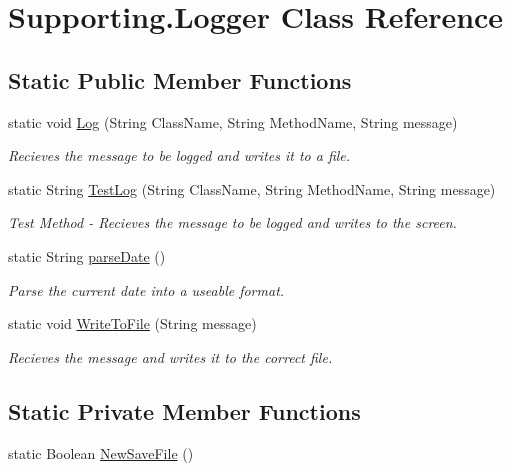 \hypertarget{class_supporting_1_1_logger}{}\section{Supporting.\+Logger Class Reference}
\label{class_supporting_1_1_logger}
\subsection*{Static Public Member Functions}
\begin{DoxyCompactItemize}
\item 
static void \hyperlink{class_supporting_1_1_logger_a97d68cf420558101dcfcff2fd28b63bb}{Log} (String Class\+Name, String Method\+Name, String message)
\begin{DoxyCompactList}\small\item\em Recieves the message to be logged and writes it to a file. \end{DoxyCompactList}\item 
static String \hyperlink{class_supporting_1_1_logger_ac2884dd455d6175b5f99af25a2ee802f}{Test\+Log} (String Class\+Name, String Method\+Name, String message)
\begin{DoxyCompactList}\small\item\em Test Method -\/ Recieves the message to be logged and writes to the screen. \end{DoxyCompactList}\item 
static String \hyperlink{class_supporting_1_1_logger_ae8e3a7713e163c2d18710067a2ae438f}{parse\+Date} ()
\begin{DoxyCompactList}\small\item\em Parse the current date into a useable format. \end{DoxyCompactList}\item 
static void \hyperlink{class_supporting_1_1_logger_acd4a2f51ea4e6b0518a99c5bfc056177}{Write\+To\+File} (String message)
\begin{DoxyCompactList}\small\item\em Recieves the message and writes it to the correct file. \end{DoxyCompactList}\end{DoxyCompactItemize}
\subsection*{Static Private Member Functions}
\begin{DoxyCompactItemize}
\item 
static Boolean \hyperlink{class_supporting_1_1_logger_aa22d1401d70452b142e7f90703539746}{New\+Save\+File} ()
\end{DoxyCompactItemize}


